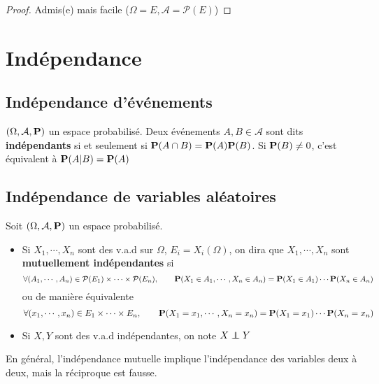 \begin{proof}
    Admis(e) mais facile ($\Omega=E, \mathcal A=\mathcal P(E)$)
\end{proof}

\section{Indépendance}

\subsection{Indépendance d'événements}

\begin{dfn}
    $(\Omega, \mathcal A, \P)$ un espace probabilisé. Deux événements $A,B\in \mathcal A$ sont dits \textbf{indépendants} si et seulement si $\P(A\cap B)=\P(A)\P(B)$. Si $\P(B)\neq 0$, c'est équivalent à $\P(A|B)=\P(A)$
\end{dfn}

\subsection{Indépendance de variables aléatoires}

\begin{dfn}
    Soit $(\Omega, \mathcal A, \P)$ un espace probabilisé. \begin{itemize}
        \item Si $X_1, \cdots, X_n$ sont des v.a.d sur $\Omega$, $E_i=X_i(\Omega)$, on dira que $X_1, \cdots,X_n$ sont \textbf{mutuellement indépendantes} si \[
                \forall (A_1,\cdots,A_n)\in \mathcal P(E_1)\times \cdots \times \mathcal P(E_n), \qquad \P(X_1\in  A_1,\cdots,X_n\in A_n)=\P(X_1\in A_1)\cdots \P(X_n\in A_n)
        \] ou de manière équivalente \[
        \forall (x_1,\cdots,x_n)\in E_1\times \cdots \times E_n, \qquad \P(X_1=x_1,\cdots,X_n=x_n)=\P(X_1=x_1)\cdots \P(X_n=x_n)
        \] 
    \item Si $X, Y$ sont des v.a.d indépendantes, on note $X\indep Y$
    \end{itemize}
\end{dfn}

\begin{rem}
    En général, l'indépendance mutuelle implique l'indépendance des variables deux à deux, mais la réciproque est fausse.
\end{rem}

